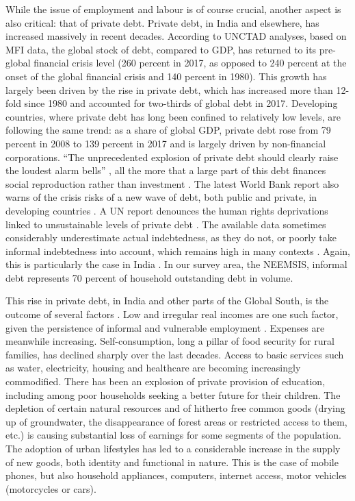 \documentclass[a4paper, 11pt, onecolumn]{article}
\begin{document}
While the issue of employment and labour is of course crucial, another aspect is also critical: that of private debt. 
Private debt, in India and elsewhere, has increased massively in recent decades. 
According to UNCTAD analyses, based on MFI data, the global stock of debt, compared to GDP, has returned to its pre-global financial crisis level (260 percent in 2017, as opposed to 240 percent at the onset of the global financial crisis and 140 percent in 1980). 
This growth has largely been driven by the rise in private debt, which has increased more than 12-fold since 1980 and accounted for two-thirds of global debt in 2017. 
Developing countries, where private debt has long been confined to relatively low levels, are following the same trend: as a share of global GDP, private debt rose from 79 percent in 2008 to 139 percent in 2017 and is largely driven by non-financial corporations. 
``The unprecedented explosion of private debt should clearly raise the loudest alarm bells'' \citep[pp. 74--75]{UNCTAD2019}, all the more that a large part of this debt finances social reproduction rather than investment \citep[p. 83]{UNCTAD2019}. The latest World Bank report also warns of the crisis risks of a new wave of debt, both public and private, in developing countries \citep{WorldBank2020}. 
A UN report denounces the human rights deprivations linked to unsustainable levels of private debt \citep{UN2020}. 
The available data sometimes considerably underestimate actual indebtedness, as they do not, or poorly take informal indebtedness into account, which remains high in many contexts \citep{Collins2009, Demirguc2018}.
Again, this is particularly the case in India \citep{Gregory1997, Nair2016}. 
In our survey area, the NEEMSIS, informal debt represents 70 percent of household outstanding debt in volume.

This rise in private debt, in India and other parts of the Global South, is the outcome of several factors \citep{Servet2013, UN2020}. 
Low and irregular real incomes are one such factor, given the persistence of informal and vulnerable employment \citep{ILO2018}. 
Expenses are meanwhile increasing. 
Self-consumption, long a pillar of food security for rural families, has declined sharply over the last decades. 
Access to basic services such as water, electricity, housing and healthcare are becoming increasingly commodified. 
There has been an explosion of private provision of education, including among poor households seeking a better future for their children. 
The depletion of certain natural resources and of hitherto free common goods (drying up of groundwater, the disappearance of forest areas or restricted access to them, etc.) is causing substantial loss of earnings for some segments of the population. 
The adoption of urban lifestyles has led to a considerable increase in the supply of new goods, both identity and functional in nature. 
This is the case of mobile phones, but also household appliances, computers, internet access, motor vehicles (motorcycles or cars). 
\end{document}
